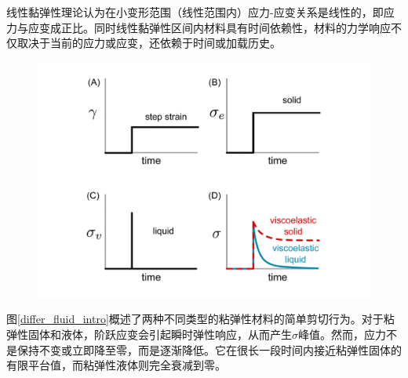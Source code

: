线性黏弹性理论认为在小变形范围（线性范围内）应力-应变关系是线性的，即应力与应变成正比。同时线性黏弹性区间内材料具有时间依赖性，材料的力学响应不仅取决于当前的应力或应变，还依赖于时间或加载历史。
\begin{figure}[htbp]
	\centering
	\includegraphics[width=\textwidth]{Fig/solid_liquid.pdf}
\end{figure}
图\ref{differ_fluid_intro}概述了两种不同类型的粘弹性材料的简单剪切行为。对于粘弹性固体和液体，阶跃应变会引起瞬时弹性响应，从而产生$\sigma$峰值。然而，应力不是保持不变或立即降至零，而是逐渐降低。它在很长一段时间内接近粘弹性固体的有限平台值，而粘弹性液体则完全衰减到零\cite{ricarteTutorialReviewLinear2024}。


